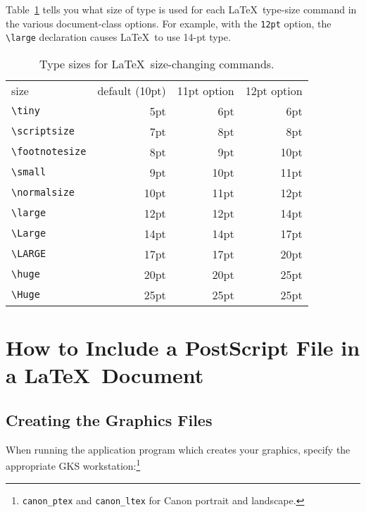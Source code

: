 \documentclass[11pt,twoside]{article}
\newcommand{\xlabel}[1]{}
\begin{document}
Table~\ref{tab:styles} tells you what size of type is used for each
\LaTeX\ type-size command in the various document-class options.  For
example, with the \texttt{12pt} option, the \hbox{\verb|\large|}
declaration causes \LaTeX\ to use 14-pt type.  

\begin{table}[htb]
\centering
\begin{tabular}{l|r|r|r|}
\multicolumn{1}{l}{size} & 
\multicolumn{1}{c}{default (10pt)} &
        \multicolumn{1}{c}{11pt option}  &
        \multicolumn{1}{c}{12pt option}\\
\cline{2-4}
\verb|\tiny|       & 5pt  & 6pt & 6pt\\
\cline{2-4}
\verb|\scriptsize| & 7pt  & 8pt & 8pt\\
\cline{2-4}
\verb|\footnotesize| & 8pt & 9pt & 10pt\\
\cline{2-4}
\verb|\small|      & 9pt  & 10pt & 11pt\\
\cline{2-4}
\verb|\normalsize| & 10pt & 11pt & 12pt \\
\cline{2-4}
\verb|\large|      & 12pt & 12pt & 14pt \\
\cline{2-4}
\verb|\Large|      & 14pt & 14pt & 17pt \\
\cline{2-4}
\verb|\LARGE|      & 17pt & 17pt & 20pt\\
\cline{2-4}
\verb|\huge|       & 20pt & 20pt & 25pt\\
\cline{2-4}
\verb|\Huge|       & 25pt & 25pt & 25pt\\
\cline{2-4}
\end{tabular}
\caption{Type sizes for \LaTeX\ size-changing commands.}\label{tab:styles}
\end{table}


\section{\xlabel{including_ps_in_latex}\label{including_ps_in_latex}
How to Include a PostScript File in a \LaTeX\ Document}

\subsection{\xlabel{creating_the_graphics_files}Creating the Graphics Files}

When running the application program which creates your graphics, 
specify the appropriate GKS workstation:\footnote{\texttt{canon\_ptex} and 
\texttt{canon\_ltex} for Canon portrait and landscape.}
\end{document}
